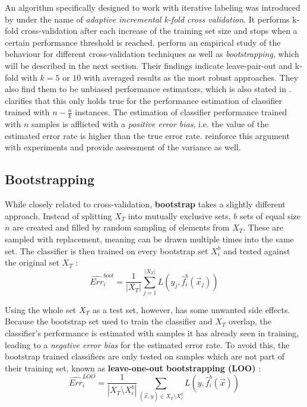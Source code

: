 An algorithm specifically designed to work with iterative labeling was introduced by \cite{BrumenEtal2004} under the name of \textit{adaptive incremental k-fold cross validation}. It performs k-fold cross-validation after each increase of the training set size and stops when a certain performance threshold is reached. \cite{AirolaEtAl2001} perform an empirical study of the behaviour for different cross-validation techniques as well as \textit{bootstrapping}, which will be described in the next section. Their findings indicate leave-pair-out and k-fold with $k = 5$ or $10$ with averaged results as the most robust approaches. They also find them to be unbiased performance estimators, which is also stated in \cite{Kohavi1995}. \cite{RodriguezEtAl2013} clarifies that this only holds true for the performance estimation of classifier trained with $n - \frac{n}{k}$ instances. The estimation of classifier performance trained with $n$ samples is afflicted with a \textit{positive error bias}, i.e. the value of the estimated error rate is higher than the true error rate. \cite{EfronEtAl1997}  reinforce this argument with experiments and provide assessment of the variance as well.

\subsection{Bootstrapping}
While closely related to cross-validation, \textbf{bootstrap} takes a slightly different approach. Instead of splitting $X_T$ into mutually exclusive sets, $b$ sets of equal size $n$ are created and filled by random sampling of elements from $X_T$. These are sampled with replacement, meaning can be drawn multiple times into the same set. The classifier is then trained on every bootstrap set $X^b_i$ and tested against the original set $X_T$ \cite{Kohavi1995}:
\begin{equation}
\widehat{Err}^{boot}_i = \frac{1}{|X_T|} \sum_{j=1}^{|X_T|} L(y_j, \hat{f}^b_i(\vec{x}_j))
\end{equation}

Using the whole set $X_T$ as a test set, however, has some unwanted side effects. Because the bootstrap set used to train the classifier and $X_T$ overlap, the classifier's performance is estimated with samples it has already seen in training, leading to a \textit{negative error bias} for the estimated error rate. To avoid this, the bootstrap trained classifiers are only tested on samples which are not part of their training set, known as \textbf{leave-one-out bootstrapping (LOO)} \cite{BorraEtAl2010}:
\begin{equation}
\widehat{Err}^{LOO}_i = \frac{1}{|X_T \setminus X^b_i|} \sum_{(\vec{x}, y) \in X_T \setminus X^b_i}^{} L(y, \hat{f}^b_i(\vec{x}))
\end{equation}


